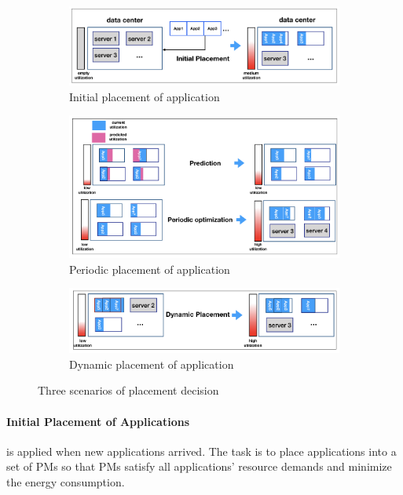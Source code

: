 \begin{figure}
	\centering
	\begin{subfigure}[b]{0.9\textwidth}
		\includegraphics[width=\textwidth]{pics/initial_placement.png}
		\caption{Initial placement of application}
	\end{subfigure}
	\begin{subfigure}[b]{0.9\textwidth}
		\includegraphics[width=\textwidth]{pics/periodic_optimization.png}
	\caption{Periodic placement of application}
	\end{subfigure}
	\begin{subfigure}[b]{0.9\textwidth}
		\includegraphics[width=\textwidth]{pics/dynamic_placement.png}
	\caption{Dynamic placement of application}
	\end{subfigure}
	\caption{Three scenarios of placement decision}
	\label{fig:management}
\end{figure}

\paragraph{Initial Placement of Applications} is applied when new applications arrived. The task is to place applications into a set of PMs \cite{Mishra:2012kx} so that PMs satisfy all applications' resource demands and minimize the energy consumption.



